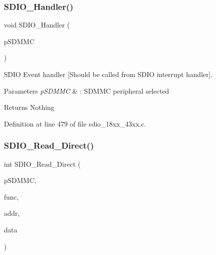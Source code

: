 \subsubsection{\texorpdfstring{S\+D\+I\+O\+\_\+\+Handler()}{SDIO\_Handler()}}
{\footnotesize\ttfamily void S\+D\+I\+O\+\_\+\+Handler (\begin{DoxyParamCaption}\item[{\hyperlink{struct_l_p_c___s_d_m_m_c___t}{L\+P\+C\+\_\+\+S\+D\+M\+M\+C\+\_\+T} $\ast$}]{p\+S\+D\+M\+MC }\end{DoxyParamCaption})}



S\+D\+IO Event handler \mbox{[}Should be called from S\+D\+IO interrupt handler\mbox{]}. 


\begin{DoxyParams}{Parameters}
{\em p\+S\+D\+M\+MC} & \+: S\+D\+M\+MC peripheral selected \\
\hline
\end{DoxyParams}
\begin{DoxyReturn}{Returns}
Nothing 
\end{DoxyReturn}


Definition at line 479 of file sdio\+\_\+18xx\+\_\+43xx.\+c.

\mbox{\label{group___s_d_i_o__18_x_x__43_x_x_gab87874960f2ffedc091b12a6021c7424}} 
\subsubsection{\texorpdfstring{S\+D\+I\+O\+\_\+\+Read\+\_\+\+Direct()}{SDIO\_Read\_Direct()}}
{\footnotesize\ttfamily int S\+D\+I\+O\+\_\+\+Read\+\_\+\+Direct (\begin{DoxyParamCaption}\item[{\hyperlink{struct_l_p_c___s_d_m_m_c___t}{L\+P\+C\+\_\+\+S\+D\+M\+M\+C\+\_\+T} $\ast$}]{p\+S\+D\+M\+MC,  }\item[{uint32\+\_\+t}]{func,  }\item[{uint32\+\_\+t}]{addr,  }\item[{uint32\+\_\+t $\ast$}]{data }\end{DoxyParamCaption})}



